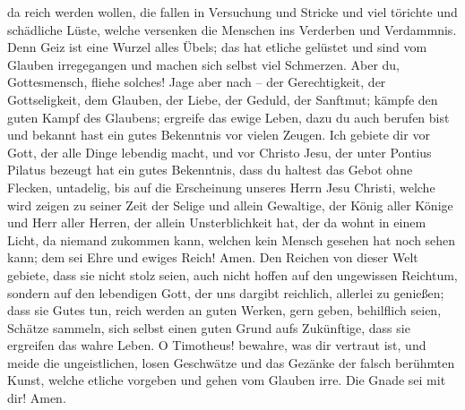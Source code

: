da reich werden wollen, die fallen in Versuchung und Stricke und viel
törichte und schädliche Lüste, welche versenken die Menschen ins
Verderben und Verdammnis.  Denn Geiz ist eine Wurzel alles
Übels; das hat etliche gelüstet und sind vom Glauben irregegangen und
machen sich selbst viel Schmerzen.  Aber du, Gottesmensch,
fliehe solches! Jage aber nach -- der Gerechtigkeit, der Gottseligkeit,
dem Glauben, der Liebe, der Geduld, der Sanftmut;  kämpfe
den guten Kampf des Glaubens; ergreife das ewige Leben, dazu du auch
berufen bist und bekannt hast ein gutes Bekenntnis vor vielen Zeugen.
 Ich gebiete dir vor Gott, der alle Dinge lebendig macht,
und vor Christo Jesu, der unter Pontius Pilatus bezeugt hat ein gutes
Bekenntnis,  dass du haltest das Gebot ohne Flecken,
untadelig, bis auf die Erscheinung unseres Herrn Jesu Christi,
 welche wird zeigen zu seiner Zeit der Selige und allein
Gewaltige, der König aller Könige und Herr aller Herren, 
der allein Unsterblichkeit hat, der da wohnt in einem Licht, da niemand
zukommen kann, welchen kein Mensch gesehen hat noch sehen kann; dem sei
Ehre und ewiges Reich! Amen.  Den Reichen von dieser Welt
gebiete, dass sie nicht stolz seien, auch nicht hoffen auf den
ungewissen Reichtum, sondern auf den lebendigen Gott, der uns dargibt
reichlich, allerlei zu genießen;  dass sie Gutes tun, reich
werden an guten Werken, gern geben, behilflich seien, 
Schätze sammeln, sich selbst einen guten Grund aufs Zukünftige, dass sie
ergreifen das wahre Leben.  O Timotheus! bewahre, was dir
vertraut ist, und meide die ungeistlichen, losen Geschwätze und das
Gezänke der falsch berühmten Kunst,  welche etliche
vorgeben und gehen vom Glauben irre. Die Gnade sei mit dir! Amen.
